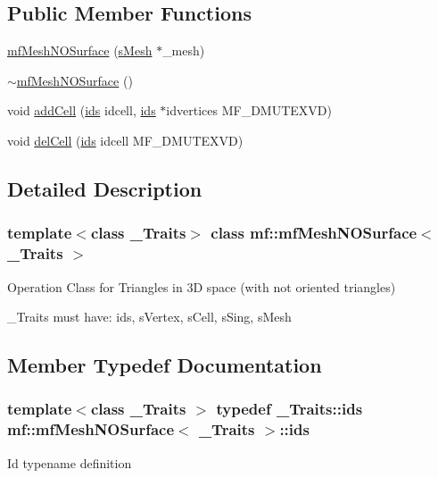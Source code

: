 \subsection*{Public Member Functions}
\begin{DoxyCompactItemize}
\item 
\hyperlink{classmf_1_1mfMeshNOSurface_a776a623404f1ecce3aace8b1145d3def}{mfMeshNOSurface} (\hyperlink{classmf_1_1mfMeshNOSurface_af5a7f4fc5fe7b228d1e96f5f37ee2dba}{sMesh} $\ast$\_\-mesh)
\item 
\hyperlink{classmf_1_1mfMeshNOSurface_a90acaff3afe1d229d9a00e4e60ff58f8}{$\sim$mfMeshNOSurface} ()
\item 
void \hyperlink{classmf_1_1mfMeshNOSurface_abd06139730cbcaa8d476f08abe4f93c0}{addCell} (\hyperlink{classmf_1_1mfMeshNOSurface_afee75f2d037d52e9a164fca832091c9b}{ids} idcell, \hyperlink{classmf_1_1mfMeshNOSurface_afee75f2d037d52e9a164fca832091c9b}{ids} $\ast$idvertices MF\_\-DMUTEXVD)
\item 
void \hyperlink{classmf_1_1mfMeshNOSurface_ab10b57f868ebc3e513e64b8395f6dfed}{delCell} (\hyperlink{classmf_1_1mfMeshNOSurface_afee75f2d037d52e9a164fca832091c9b}{ids} idcell MF\_\-DMUTEXVD)
\end{DoxyCompactItemize}


\subsection{Detailed Description}
\subsubsection*{template$<$class \_\-Traits$>$ class mf::mfMeshNOSurface$<$ \_\-Traits $>$}

Operation Class for Triangles in 3D space (with not oriented triangles)

\_\-Traits must have: ids, sVertex, sCell, sSing, sMesh 

\subsection{Member Typedef Documentation}
\hypertarget{classmf_1_1mfMeshNOSurface_afee75f2d037d52e9a164fca832091c9b}{
\subsubsection[{ids}]{\setlength{\rightskip}{0pt plus 5cm}template$<$class \_\-Traits $>$ typedef \_\-Traits::ids {\bf mf::mfMeshNOSurface}$<$ \_\-Traits $>$::{\bf ids}}}
\label{classmf_1_1mfMeshNOSurface_afee75f2d037d52e9a164fca832091c9b}
Id typename definition 

